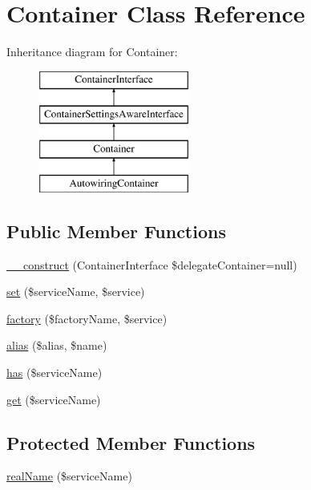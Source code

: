 \hypertarget{class_pes_1_1_container_1_1_container}{}\section{Container Class Reference}
\label{class_pes_1_1_container_1_1_container}
Inheritance diagram for Container\+:\begin{figure}[H]
\begin{center}
\leavevmode
\includegraphics[height=4.000000cm]{class_pes_1_1_container_1_1_container}
\end{center}
\end{figure}
\subsection*{Public Member Functions}
\begin{DoxyCompactItemize}
\item 
\mbox{\hyperlink{class_pes_1_1_container_1_1_container_a8e12a4a1a37991b6fd64ca2eb415d152}{\+\_\+\+\_\+construct}} (Container\+Interface \$delegate\+Container=null)
\item 
\mbox{\hyperlink{class_pes_1_1_container_1_1_container_a0a6f88d94e8821447a2e233146b18344}{set}} (\$service\+Name, \$service)
\item 
\mbox{\hyperlink{class_pes_1_1_container_1_1_container_af120db1d78ad428681293ca220675616}{factory}} (\$factory\+Name, \$service)
\item 
\mbox{\hyperlink{class_pes_1_1_container_1_1_container_a2c929207e3eb4803b5841ad89133cbbe}{alias}} (\$alias, \$name)
\item 
\mbox{\hyperlink{class_pes_1_1_container_1_1_container_a91d786bf5e60430567a9de84ebbcbfdd}{has}} (\$service\+Name)
\item 
\mbox{\hyperlink{class_pes_1_1_container_1_1_container_a1a84a087ff94c2fb4af5e4b25d2b2d53}{get}} (\$service\+Name)
\end{DoxyCompactItemize}
\subsection*{Protected Member Functions}
\begin{DoxyCompactItemize}
\item 
\mbox{\hyperlink{class_pes_1_1_container_1_1_container_a48a6a65b0ccc5284dd7c87ca496f3f3d}{real\+Name}} (\$service\+Name)
\end{DoxyCompactItemize}
